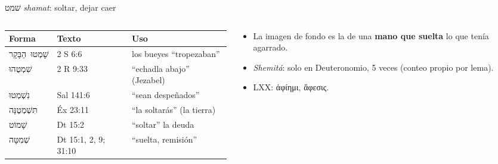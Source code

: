 \documentclass[hyperref={bookmarks=false},aspectratio=169]{beamer}
\newcommand{\heb}[1]{\mbox{\foreignlanguage{hebrew}{#1}}}
\newcommand{\grc}[1]{\foreignlanguage{ancientgreek}{#1}}
\newcommand{\destacar}[1]{\textbf{\textcolor{tierraroja}{#1}}}
\begin{document}
\begin{frame}{\heb{שׁמט} \emph{shamat}: soltar, dejar caer}
\begin{columns}[t,onlytextwidth]
\begin{column}{0.56\textwidth}
\scriptsize\renewcommand{\arraystretch}{1.12}
\begin{tabular}{@{}L{2.0cm}L{1.4cm}L{3.2cm}@{}}
\toprule
\textbf{Forma} & \textbf{Texto} & \textbf{Uso} \\ \midrule
\heb{שָׁמְטוּ הַבָּקָר} & 2 S 6:6 & los bueyes ``tropezaban'' \\
\heb{שִׁמְטֻהוּ} & 2 R 9:33 & ``echadla abajo'' (Jezabel) \\
\heb{נִשְׁמְטוּ} & Sal 141:6 & ``sean despeñados'' \\
\heb{תִּשְׁמְטֶנָּה} & Éx 23:11 & ``la soltarás'' (la tierra) \\
\heb{שָׁמוֹט} & Dt 15:2 & ``soltar'' la deuda \\
\heb{שְׁמִטָּה} & Dt 15:1, 2, 9; 31:10 & ``suelta, remisión'' \\
\bottomrule
\end{tabular}
\end{column}
\begin{column}{0.42\textwidth}\small
\begin{itemize}
\item La imagen de fondo es la de una \destacar{mano que suelta} lo que tenía agarrado.
\item \emph{Shemitá}: solo en Deuteronomio, 5 veces (conteo propio por lema).
\item LXX: \grc{ἀφίημι}, \grc{ἄφεσις}.
\end{itemize}
\end{column}
\end{columns}
\end{frame}
\end{document}
